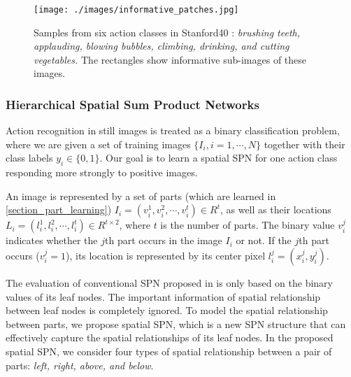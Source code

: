\documentclass[journal]{IEEEtran}
\begin{document}
\begin{figure*}[htb]
	\begin{center}
		\texttt{[image: ./images/informative\_patches.jpg]}
	\end{center}
	\caption{Samples from six action classes in Stanford40 \cite{Yao11humanaction__Stanford40}: \textit{brushing teeth, applauding, blowing bubbles, climbing, drinking, and cutting vegetables.} The rectangles show informative sub-images of these images.}
	\label{fig:informativePatches}
\end{figure*}



\subsubsection{Hierarchical Spatial Sum Product Networks}



Action recognition in still images is treated as a binary classification problem, where we are given a set of training images $  \{ I_i, i=1,\cdots, N \} $ together with their class labels $ y_i \in \{ 0,1 \} $. Our goal is to learn a spatial SPN for one action class responding more strongly to positive images.




An image is represented by a set of parts (which are learned in \ref{section_part_learning}) $ I_i = (v_i^1,v_i^2, \cdots, v_i^t) \in R^t $, as well as their locations $L_i=(l_i^1,l_i^2, \cdots , l_i^t) \in R^{t\times 2}$, where $ t $ is the number of parts. The binary value $ v_i^j $ indicates whether the $ j $th part occurs in the image $ I_i $ or not. If the $ j $th part occurs ($ v_i^j=1 $), its location is represented by its center pixel $ l_i^j=(x_i^j,y_i^j) $.


The evaluation of conventional SPN proposed in \cite{poon2011SPNIntroduce} is only based on the binary values of its leaf nodes. The important information of spatial relationship between leaf nodes is completely ignored.
To model the spatial relationship between parts, we propose spatial SPN, which is a new SPN structure that can effectively capture the spatial relationships of its leaf nodes. In the proposed spatial SPN, we consider four types of spatial relationship between a pair of parts: \textit{left, right, above, and below}.
\end{document}
